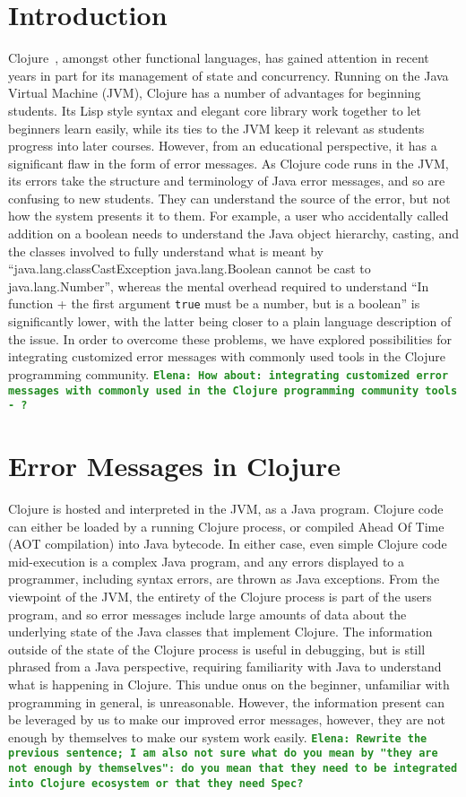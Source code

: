 \documentclass[12pt]{article}
\newcommand{\comment}[1]{{\bf \tt  {#1}}}
\newcommand{\emcomment}[1]{\textcolor{ForestGreen}{\comment{Elena: {#1}}}}
\begin{document}
\newpage
\setcounter{page}{1}

\section{Introduction}
Clojure~\cite{Hickey:2008}, amongst other functional languages, has gained attention in recent years
in part for its management of state and concurrency.
Running on the Java Virtual Machine (JVM), Clojure has a number of advantages for beginning students.
Its Lisp style syntax and elegant core library work together to let beginners learn easily, while
its ties to the JVM keep it relevant as students progress into later courses.
However, from an educational perspective, it has a significant flaw in the form of error messages.
As Clojure code runs in the JVM, its errors take the structure and terminology of Java error messages,
and so are confusing to new students. They can understand the source of the error,
but not how the system presents it to them.
For example, a user who accidentally called addition on a boolean needs
 to understand the Java object hierarchy, casting,
 and the classes involved to fully understand what is meant by
 ``java.lang.classCastException java.lang.Boolean cannot be cast to java.lang.Number'',
whereas the mental overhead required to understand
``In function + the first argument {\tt true} must be a number, but is a boolean''
 is significantly lower, with the latter being closer to a plain language
 description of the issue.
 In order to overcome these problems,
 we have explored possibilities for integrating customized error messages
 with commonly used tools in the Clojure programming community.
\emcomment{How about:  integrating customized error messages
 with commonly used  in the Clojure programming community tools - ?}

\section{Error Messages in Clojure}
Clojure is hosted and interpreted in the JVM, as a Java program.
Clojure code can either be loaded by a running Clojure process, or
compiled Ahead Of Time (AOT compilation) into Java bytecode. In either case,
even simple Clojure code mid-execution is a complex Java program,
and any errors displayed to a programmer, including syntax errors, are thrown as Java exceptions.
From the viewpoint of the JVM, the entirety of the Clojure process is
part of the users program, and so error messages include large amounts
of data about the underlying state of the Java classes that implement Clojure.
The information outside of the state of the Clojure process is useful in debugging,
but is still phrased from a Java perspective, requiring familiarity with Java
to understand what is happening in Clojure.
This undue onus on the beginner,
unfamiliar with programming in general, is unreasonable.
However, the information present can be leveraged by us to make our improved
error messages, however, they are not enough by themselves to make our system
work easily. 
\emcomment{Rewrite the previous sentence; I am also not sure what do you mean by 
"they are not enough by themselves": do you mean that they need to be integrated into
Clojure ecosystem or that they need Spec?}
\end{document}
